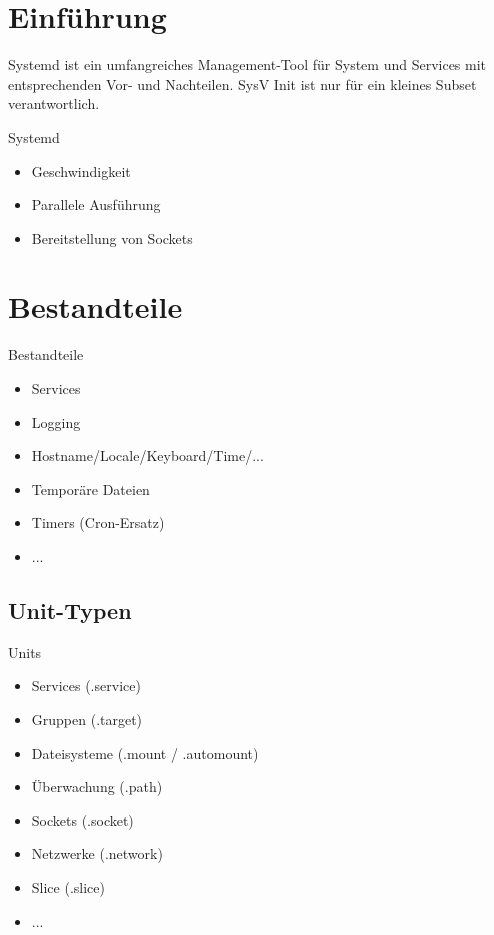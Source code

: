 
\maketitle

\begin{frame}
  \titlepage
\end{frame}

\cleardoublepage

\tableofcontents

\cleardoublepage

\section{Einführung}

Systemd ist ein umfangreiches Management-Tool für System und Services mit
entsprechenden Vor- und Nachteilen. SysV Init ist nur für ein kleines Subset verantwortlich.

\begin{frame}{Systemd}
  \begin{itemize}
    \item Geschwindigkeit
    \item Parallele Ausführung
    \item Bereitstellung von Sockets
  \end{itemize}
\end{frame}

\section{Bestandteile}

\begin{frame}{Bestandteile}
  \begin{itemize}
\item Services
\item Logging
\item Hostname/Locale/Keyboard/Time/...
\item Temporäre Dateien
\item Timers (Cron-Ersatz)
\item ...
\end{itemize}
\end{frame}

\subsection{Unit-Typen}

\begin{frame}{Units}
  \begin{itemize}
  \item Services (.service)
  \item Gruppen (.target)
  \item Dateisysteme (.mount / .automount)
  \item Überwachung (.path)
  \item Sockets (.socket)
  \item Netzwerke (.network)
  \item Slice (.slice)
  \item ...
\end{itemize}
\end{frame}

